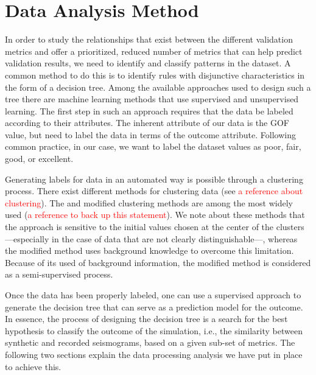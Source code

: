 
\section{Data Analysis Method} 
\label{sec:approach}

In order to study the relationships that exist between the different validation metrics and offer a prioritized, reduced number of metrics that can help predict validation results, we need to identify and classify patterns in the dataset. A common method to do this is to identify rules with disjunctive characteristics in the form of a decision tree. Among the available approaches used to design such a tree there are machine learning methods that use supervised and unsupervised learning. The first step in such an approach requires that the data be labeled according to their attributes. The inherent attribute of our data is the GOF value, but need to label the data in terms of the outcome attribute. Following common practice, in our case, we want to label the dataset values as poor, fair, good, or excellent.

Generating labels for data in an automated way is possible through a clustering process. There exist different methods for clustering data (see \textcolor{red}{a reference about clustering}). The \kmeans{} and modified \kmeans{} clustering methods are among the most widely used (\textcolor{red}{a reference to back up this statement}). We note about these methods that the \kmeans{} approach is sensitive to the initial values chosen at the center of the clusters---especially in the case of data that are not clearly distinguishable---, whereas the modified \kmeans{} method uses background knowledge to overcome this limitation. Because of its used of background information, the modified \kmeans{} method is considered as a semi-supervised process.

Once the data has been properly labeled, one can use a supervised approach to generate the decision tree that can serve as a prediction model for the outcome. In essence, the process of designing the decision tree is a search for the best hypothesis to classify the outcome of the simulation, i.e., the similarity between synthetic and recorded seismograms, based on a given sub-set of metrics. The following two sections explain the data processing analysis we have put in place to achieve this.



